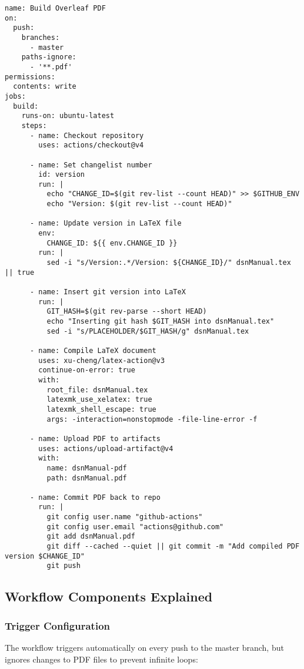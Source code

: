 \begin{verbatim}
name: Build Overleaf PDF
on:
  push:
    branches:
      - master
    paths-ignore:
      - '**.pdf'
permissions:
  contents: write
jobs:
  build:
    runs-on: ubuntu-latest
    steps:
      - name: Checkout repository
        uses: actions/checkout@v4
      
      - name: Set changelist number
        id: version
        run: |
          echo "CHANGE_ID=$(git rev-list --count HEAD)" >> $GITHUB_ENV
          echo "Version: $(git rev-list --count HEAD)"
      
      - name: Update version in LaTeX file
        env:
          CHANGE_ID: ${{ env.CHANGE_ID }}
        run: |
          sed -i "s/Version:.*/Version: ${CHANGE_ID}/" dsnManual.tex || true
      
      - name: Insert git version into LaTeX
        run: |
          GIT_HASH=$(git rev-parse --short HEAD)
          echo "Inserting git hash $GIT_HASH into dsnManual.tex"
          sed -i "s/PLACEHOLDER/$GIT_HASH/g" dsnManual.tex
          
      - name: Compile LaTeX document
        uses: xu-cheng/latex-action@v3
        continue-on-error: true
        with:
          root_file: dsnManual.tex
          latexmk_use_xelatex: true
          latexmk_shell_escape: true
          args: -interaction=nonstopmode -file-line-error -f
      
      - name: Upload PDF to artifacts
        uses: actions/upload-artifact@v4
        with:
          name: dsnManual-pdf
          path: dsnManual.pdf
      
      - name: Commit PDF back to repo
        run: |
          git config user.name "github-actions"
          git config user.email "actions@github.com"
          git add dsnManual.pdf
          git diff --cached --quiet || git commit -m "Add compiled PDF version $CHANGE_ID"
          git push
\end{verbatim}

\subsection{Workflow Components Explained}

\subsubsection{Trigger Configuration}

The workflow triggers automatically on every push to the master branch, but ignores changes to PDF files to prevent infinite loops:

